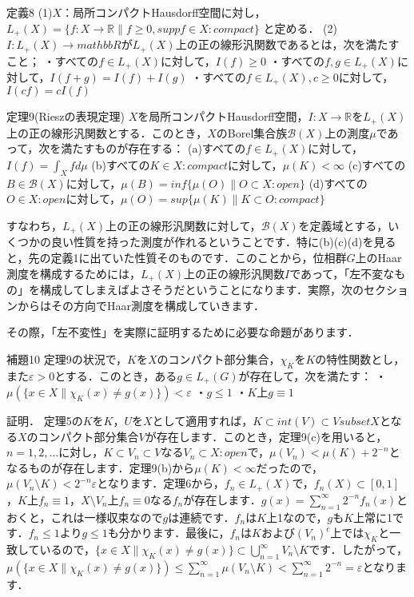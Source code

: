 定義8
(1)$X$：局所コンパクトHausdorff空間に対し，
$L_{+}(X)= \{ f \colon X \to \mathbb{R} \| f \ge 0, supp f \in X \colon compact\}$ と定める．
(2)$I \colon L_{+}(X) \to mathbb{R}$が$L_{+}(X)$上の正の線形汎関数であるとは，次を満たすこと；
・すべての$f \in L_{+}(X)$に対して，$I(f) \ge 0$
・すべての$f,g \in L_{+}(X)$に対して，$I(f+g)=I(f)+I(g)$
・すべての$f \in L_{+}(X), c \ge 0$に対して，$I(cf)=cI(f)$

定理9(Rieszの表現定理)
$X$を局所コンパクトHausdorff空間，$I \colon X \to \mathbb{R}$を$L_{+}(X)$上の正の線形汎関数とする．このとき，$X$のBorel集合族$\mathscr{B}(X)$上の測度$\mu$であって，次を満たすものが存在する：
(a)すべての$f \in L_{+}(X)$に対して，$I(f)=\int_{X}fd\mu$
(b)すべての$K \in X \colon compact$に対して，$\mu(K)<\infty$
(c)すべての$B \in \mathscr{B}(X)$に対して，$\mu(B)=inf \{ \mu(O) \| O \subset X \colon open \}$
(d)すべての$O \in X \colon open$に対して，$\mu(O)=sup \{ \mu(K) \| K \subset O \colon compact \}$

すなわち，$L_{+}(X)$上の正の線形汎関数に対して，$\mathscr{B}(X)$を定義域とする，いくつかの良い性質を持った測度が作れるということです．特に(b)(c)(d)を見ると，先の定義1に出ていた性質そのものです．このことから，位相群$G$上のHaar測度を構成するためには，$L_{+}(X)$上の正の線形汎関数$I$であって，「左不変なもの」を構成してしまえばよさそうだということになります．実際，次のセクションからはその方向でHaar測度を構成していきます．

その際，「左不変性」を実際に証明するために必要な命題があります．

補題10
定理9の状況で，$K$を$X$のコンパクト部分集合，$\chi_{K}$を$K$の特性関数とし，また$\varepsilon >0$とする．このとき，ある$g \in L_{+}(G)$が存在して，次を満たす：
・$\mu ( \{ x \in X \| \chi_{K}(x) \neq g(x) \} ) < \varepsilon $
・$g \le 1$
・$K$上$g \equiv 1$

証明．
定理5の$K$を$K$，$U$を$X$として適用すれば，$K \subset int(V) \subset V subset X$となる$X$のコンパクト部分集合$V$が存在します．このとき，定理9(c)を用いると，$n=1,2,\ldots$に対し，$K \subset V_n \subset V$なる$V_n \subset X \colon open$で，$\mu(V_n) < \mu(K) + 2^{-n}$となるものが存在します．定理9(b)から$\mu(K)<\infty$だったので，$\mu(V_n \setminus K) < 2^{-n}\varepsilon$となります．定理6から，$f_n \in L_{+}(X)$で，$f_n(X) \subset [0,1]$，$K$上$f_n \equiv 1$，$X \setminus V_n$上$f_n \equiv 0$なる$f_n$が存在します．$g(x)=\sum_{n=1}^{\infty}2^{-n}f_n(x)$とおくと，これは一様収束なので$g$は連続です．$f_n$は$K$上1なので，$g$も$K$上常に1です．$f_n \le 1$より$g \le 1$も分かります．最後に，$f_n$は$K$および$(V_n)^{c}$上では$\chi_{K}$と一致しているので，$\{ x \in X \| \chi_{K}(x) \neq g(x) \} \subset \bigcup_{n=1}^{\infty}V_n \setminus K$です．したがって，$\mu( \{ x \in X \| \chi_{K}(x) \neq g(x) \} ) \le \sum_{n=1}^{\infty} \mu(V_n \setminus K) < \sum_{n=1}^{\infty}2^{-n}=\varepsilon$となります．

